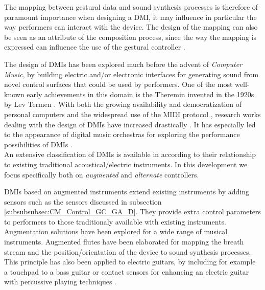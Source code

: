 {{The mapping between gestural data and sound synthesis processes is therefore of paramount importance when designing a DMI, it may influence in particular the way performers can interact with the device. The design of the mapping can also be seen as an attribute of the composition process, since the way the mapping is expressed can influence the use of the gestural controller .


				\label{subsubsubsec:CM_Control_GC_DMIs}

The design of DMIs has been explored much before the advent of \emph{Computer Music}, by building electric and/or electronic interfaces for generating sound from novel control surfaces that could be used by performers. One of the most well-known early achievements in this domain is the Theremin invented in the 1920s by Lev Termen . With both the growing availability and democratization of personal computers and the widespread use of the MIDI protocol , research works dealing with the design of DMIs have increased drastically . %
It has especially led to the appearance of digital music orchestras for exploring the performance possibilities of DMIs .\\

An extensive classification of DMIs is available in  according to their relationship to existing traditional acoustical/electric instruments. In this development we focus specifically both on \emph{augmented} and \emph{alternate} controllers.

DMIs based on augmented instruments extend existing instruments by adding sensors such as the sensors discussed in subsection \ref{subsubsubsec:CM_Control_GC_GA_D}. They provide extra control parameters to performers to those traditionaly available with existing instruments. Augmentation solutions have been explored for a wide range of musical instruments. Augmented flutes have been elaborated for mapping the breath stream  and the position/orientation of the device  to sound synthesis processes. This principle has also been applied to electric guitars, by including for example a touchpad to a bass guitar  or contact sensors for enhancing an electric guitar with percussive playing techniques .

}}
